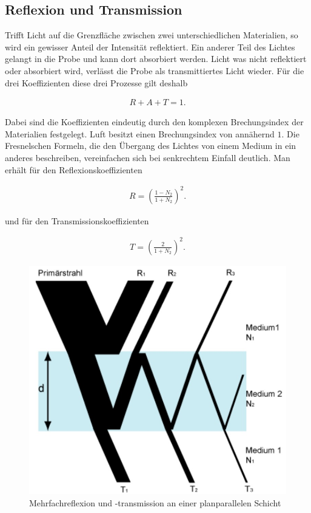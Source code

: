 \documentclass[paper=a4,fontsize=10pt,DIV=18,twocolumn,parskip=half]{scrartcl}
\numberwithin{equation}{section}    %
\begin{document}
\subsection{Reflexion und Transmission}
Trifft Licht auf die Grenzfläche zwischen zwei unterschiedlichen Materialien, so 
wird ein gewisser Anteil der Intensität reflektiert. Ein anderer Teil des 
Lichtes gelangt in die Probe und kann dort absorbiert werden. Licht was nicht 
reflektiert oder absorbiert wird, verlässt die Probe als transmittiertes Licht 
wieder. Für die drei Koeffizienten diese drei Prozesse gilt deshalb

\begin{align}
    R+A+T=1.
\end{align}

Dabei sind die Koeffizienten eindeutig durch den komplexen Brechungsindex der 
Materialien festgelegt. Luft besitzt einen Brechungsindex von annähernd $1$.
Die Fresnelschen Formeln, die den Übergang des Lichtes von einem Medium in ein 
anderes beschreiben, vereinfachen sich bei senkrechtem Einfall deutlich. Man 
erhält für den Reflexionskoeffizienten

\begin{align}
    R=\left(\frac{1-N_2}{1+N_2}\right)^2.
\end{align}

und für den Transmissionskoeffizienten 

\begin{align}
    T=\left(\frac{2}{1+N_2}\right)^2.
\end{align}

\begin{figure}
    \centering
    \includegraphics[width=0.6\columnwidth]{Bilder/Reflexion.jpg}
    \caption{Mehrfachreflexion und -transmission an einer planparallelen 
    Schicht}
    \label{multi}
\end{figure}
\end{document}
